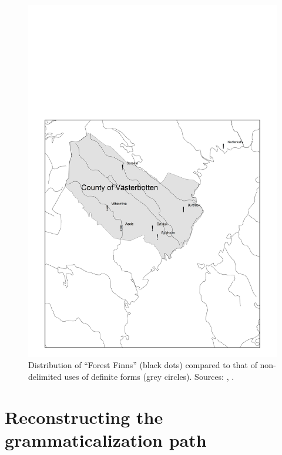 \begin{figure}[h]

\includegraphics{figures_mod/image16}
\caption{Distribution of “Forest Finns” (black dots) compared to that of non-delimited uses of definite forms (grey circles). Sources: \citet{Tarkiainen1990}, \citet{Broberg1980}.}
\label{map:16}

\end{figure}

\section{ Reconstructing the grammaticalization path}
\label{bkm:Ref154983462}

